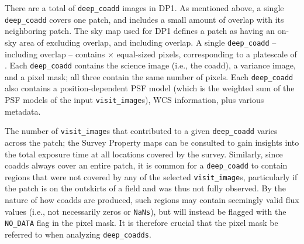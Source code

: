 There are a total of \ndeepcoadds \texttt{deep\_coadd} images in \gls{DP1}.
As mentioned above, a single \texttt{deep\_coadd} covers one \gls{patch}, and includes a small amount of overlap with its neighboring \gls{patch}.
The sky map used for \gls{DP1} defines a \gls{patch} as having an on-sky area of \innerpatcharea excluding overlap, and \outerpatcharea including overlap.
A single \texttt{deep\_coadd} -- including overlap -- contains \ndeepcoaddpixx $\xspace\times\xspace$ \ndeepcoaddpixy equal-sized pixels, corresponding to a platescale of \rawplatescale.
Each \texttt{deep\_coadd} contains the science image (i.e., the coadd), a variance image, and a pixel mask; all three contain the same number of pixels.
Each \texttt{deep\_coadd} also contains a position-dependent \gls{PSF} model (which is the weighted sum of the \gls{PSF} models of the input \texttt{visit\_image}s), \gls{WCS} information, plus various \gls{metadata}.

The number of \texttt{visit\_image}s that contributed to a given \texttt{deep\_coadd} varies across the patch; the Survey Property maps can be consulted to gain insights into the total exposure time at all locations covered by the survey.
Similarly, since coadds always cover an entire \gls{patch}, it is common for a \texttt{deep\_coadd} to contain regions that were not covered by any of the selected \texttt{visit\_image}s, particularly if the \gls{patch} is on the outskirts of a field and was thus not fully observed.
By the nature of how coadds are produced, such regions may contain seemingly valid \gls{flux} values (i.e., not necessarily zeros or \texttt{NaNs}), but will instead be flagged with the \texttt{NO\_DATA} flag in the pixel mask.
It is therefore crucial that the pixel mask be referred to when analyzing \texttt{deep\_coadds}.

